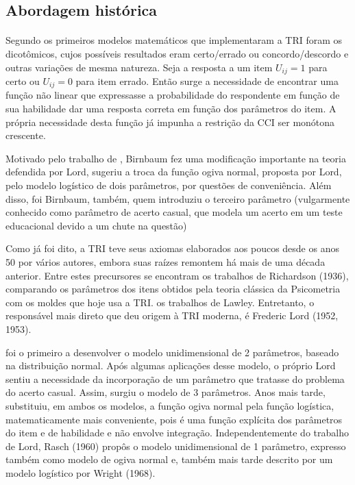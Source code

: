 	\subsection{Abordagem histórica}
	\paragraph{}
	    Segundo \textcite{Dalton} os primeiros modelos matemáticos que implementaram a TRI foram os dicotômicos, cujos possíveis resultados eram certo/errado ou concordo/descordo e outras variações de mesma natureza. Seja a resposta a um item $U_{ij} = 1$ para certo ou $U_{ij} = 0$ para item errado. Então surge a necessidade de encontrar uma função não linear que expressasse a probabilidade do respondente em função de sua habilidade dar uma resposta correta em função dos parâmetros do item. A própria necessidade desta função já impunha a restrição da CCI ser monótona crescente. %
    \par	 
        Motivado pelo trabalho de \textcite{Lord}, Birnbaum fez uma modificação importante na teoria defendida por Lord, sugeriu a troca da função ogiva normal, proposta por Lord, pelo modelo logístico de dois parâmetros, por questões de conveniência. Além disso, foi Birnbaum, também, quem introduziu o terceiro parâmetro (vulgarmente conhecido como parâmetro de acerto casual, que modela um acerto em um teste educacional devido a um chute na questão)
	\par
		Como já foi dito, a TRI teve seus axiomas elaborados aos poucos desde os anos 50 por vários autores, embora suas raízes remontem há mais de uma década anterior. Entre estes precursores se encontram os trabalhos de Richardson (1936), comparando os parâmetros dos itens obtidos pela teoria clássica da Psicometria com os moldes que hoje usa a TRI. os trabalhos de Lawley. Entretanto, o responsável mais direto que deu origem à TRI moderna, é Frederic Lord (1952, 1953).
	\par
        \textcite{Lord} foi o primeiro a desenvolver o modelo unidimensional de 2 parâmetros, baseado na distribuição normal. Após algumas aplicações desse modelo, o próprio Lord sentiu a necessidade da incorporação de um parâmetro que tratasse do problema do acerto casual. Assim, surgiu o modelo de 3 parâmetros. Anos mais tarde, \textcite{Birnbaum} substituiu, em ambos os modelos, a função ogiva normal pela função logística, matematicamente mais conveniente, pois é uma função explícita dos parâmetros do item e de habilidade e não envolve integração. Independentemente do trabalho de Lord, Rasch (1960) propôs o modelo unidimensional de 1 parâmetro, expresso também como modelo de ogiva normal e, também mais tarde descrito por um modelo logístico por Wright (1968).
        \cite{Hamblenton}
